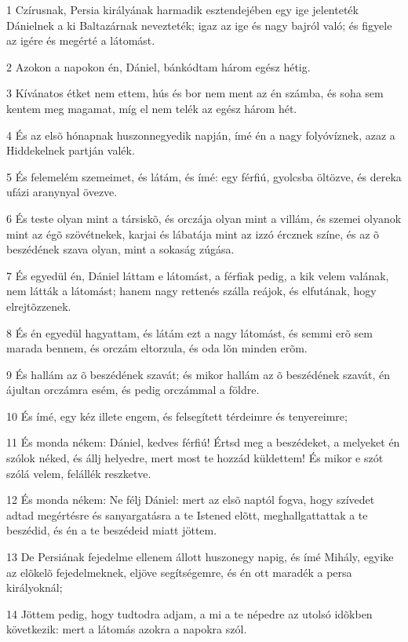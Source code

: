 \par 1 Czírusnak, Persia királyának harmadik esztendejében egy ige jelenteték Dánielnek a  ki Baltazárnak nevezteték; igaz az ige és nagy bajról való; és figyele az igére és megérté a látomást.
\par 2 Azokon a napokon én, Dániel, bánkódtam három egész hétig.
\par 3 Kívánatos étket nem ettem, hús és bor nem ment az én számba, és soha sem kentem meg magamat, míg el nem telék az egész három hét.
\par 4 És az elsõ hónapnak huszonnegyedik napján, ímé én a nagy folyóvíznek, azaz a Hiddekelnek partján valék.
\par 5 És felemelém szemeimet, és látám, és ímé: egy férfiú, gyolcsba öltözve, és dereka ufázi aranynyal övezve.
\par 6 És teste olyan mint a társiskõ, és orczája olyan mint a villám, és szemei olyanok mint az égõ szövétnekek, karjai és lábatája mint az izzó ércznek színe, és az õ beszédének szava olyan, mint a sokaság zúgása.
\par 7 És egyedül én, Dániel láttam e látomást, a férfiak pedig, a kik velem valának, nem látták a látomást; hanem nagy rettenés szálla reájok, és elfutának, hogy elrejtõzzenek.
\par 8 És én egyedül hagyattam, és látám ezt a nagy látomást, és semmi erõ sem marada bennem, és orczám eltorzula, és oda lõn minden erõm.
\par 9 És hallám az õ beszédének szavát; és mikor hallám az õ beszédének szavát, én ájultan orczámra esém, és pedig orczámmal a földre.
\par 10 És ímé, egy kéz illete engem, és felsegített térdeimre és tenyereimre;
\par 11 És monda nékem: Dániel, kedves férfiú! Értsd meg a beszédeket, a melyeket én szólok néked, és állj helyedre, mert most te hozzád küldettem! És mikor e szót szólá velem, felállék reszketve.
\par 12 És monda nékem: Ne félj Dániel: mert az elsõ naptól fogva, hogy szívedet adtad megértésre és sanyargatásra a te Istened elõtt, meghallgattattak a te beszédid, és én a te beszédeid miatt jöttem.
\par 13 De Persiának fejedelme ellenem állott huszonegy napig, és ímé Mihály, egyike az elõkelõ fejedelmeknek, eljöve segítségemre, és én ott maradék a persa királyoknál;
\par 14 Jöttem pedig, hogy tudtodra adjam, a mi a te népedre az utolsó idõkben következik: mert a látomás azokra a napokra szól.
